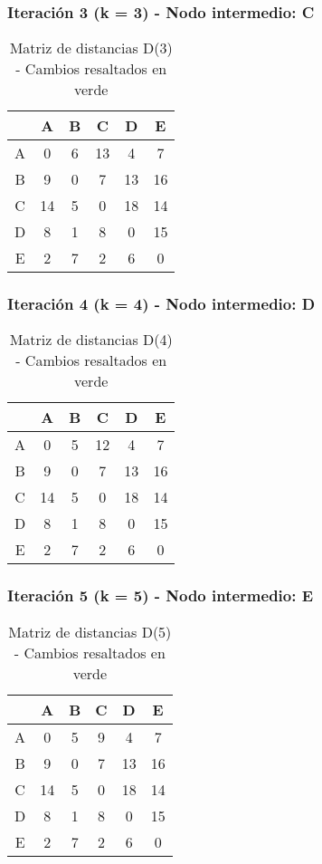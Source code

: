 \documentclass[12pt]{article}
\begin{document}
\subsubsection{Iteración 3 (k = 3) - Nodo intermedio: C}
\begin{table}[h!]
\centering
\begin{tabular}{|c|c|c|c|c|c|}
\hline
 & A & B & C & D & E \\\hline
A & 0 & 6 & 13 & 4 & 7 \\\hline
B & 9 & 0 & 7 & 13 & 16 \\\hline
C & 14 & 5 & 0 & 18 & 14 \\\hline
D & 8 & 1 & 8 & 0 & 15 \\\hline
E & 2 & \cellcolor{lightgreen} 7 & 2 & 6 & 0 \\\hline
\end{tabular}
\caption{Matriz de distancias D(3) - Cambios resaltados en verde}
\end{table}

\subsubsection{Iteración 4 (k = 4) - Nodo intermedio: D}
\begin{table}[h!]
\centering
\begin{tabular}{|c|c|c|c|c|c|}
\hline
 & A & B & C & D & E \\\hline
A & 0 & \cellcolor{lightgreen} 5 & \cellcolor{lightgreen} 12 & 4 & 7 \\\hline
B & 9 & 0 & 7 & 13 & 16 \\\hline
C & 14 & 5 & 0 & 18 & 14 \\\hline
D & 8 & 1 & 8 & 0 & 15 \\\hline
E & 2 & 7 & 2 & 6 & 0 \\\hline
\end{tabular}
\caption{Matriz de distancias D(4) - Cambios resaltados en verde}
\end{table}

\subsubsection{Iteración 5 (k = 5) - Nodo intermedio: E}
\begin{table}[h!]
\centering
\begin{tabular}{|c|c|c|c|c|c|}
\hline
 & A & B & C & D & E \\\hline
A & 0 & 5 & \cellcolor{lightgreen} 9 & 4 & 7 \\\hline
B & 9 & 0 & 7 & 13 & 16 \\\hline
C & 14 & 5 & 0 & 18 & 14 \\\hline
D & 8 & 1 & 8 & 0 & 15 \\\hline
E & 2 & 7 & 2 & 6 & 0 \\\hline
\end{tabular}
\caption{Matriz de distancias D(5) - Cambios resaltados en verde}
\end{table}
\end{document}
